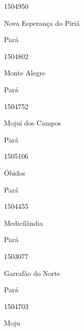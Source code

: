 \documentclass[
  letterpaper,
]{report}
\begin{document}
1504950

\n      

Nova Esperança do Piriá

\n    

\n    

\n      

Pará

\n      

1504802

\n      

Monte Alegre

\n    

\n    

\n      

Pará

\n      

1504752

\n      

Mojuí dos Campos

\n    

\n    

\n      

Pará

\n      

1505106

\n      

Óbidos

\n    

\n    

\n      

Pará

\n      

1504455

\n      

Medicilândia

\n    

\n    

\n      

Pará

\n      

1503077

\n      

Garrafão do Norte

\n    

\n    

\n      

Pará

\n      

1504703

\n      

Moju

\n    

\n    
\end{document}
